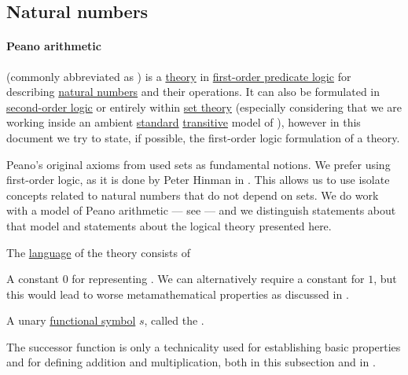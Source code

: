 \subsection{Natural numbers}\label{subsec:natural_numbers}

\paragraph{Peano arithmetic}

\begin{definition}\label{def:peano_arithmetic}
   (commonly abbreviated as ) is a \hyperref[def:first_order_theory]{theory} in \hyperref[subsec:first_order_logic]{first-order predicate logic} for describing \hyperref[def:natural_numbers]{natural numbers} and their operations. It can also be formulated in \hyperref[rem:higher_order_logic]{second-order logic} or entirely within \hyperref[sec:set_theory]{set theory} (especially considering that we are working inside an ambient \hyperref[rem:standard_model_of_set_theory]{standard} \hyperref[rem:transitive_model_of_set_theory]{transitive} model of \hyperref[def:axiom_of_universes]{}), however in this document we try to state, if possible, the first-order logic formulation of a theory.

  Peano's original axioms from \cite[1]{Peano1889} used sets as fundamental notions. We prefer using first-order logic, as it is done by Peter Hinman in . This allows us to use isolate concepts related to natural numbers that do not depend on sets. We do work with a model of Peano arithmetic --- see  --- and we distinguish statements about that model and statements about the logical theory presented here.

  The \hyperref[def:first_order_language]{language} of the theory consists of
  \begin{thmenum}[series=def:peano_arithmetic]
     A constant \( 0 \) for representing . We can alternatively require a constant for \( 1 \), but this would lead to worse metamathematical properties as discussed in .

     A unary \hyperref[def:first_order_language/fun]{functional symbol} \( s \), called the .

    The successor function is only a technicality used for establishing basic properties and for defining addition and multiplication, both in this subsection and in .


\end{thmenum}
\end{definition}
